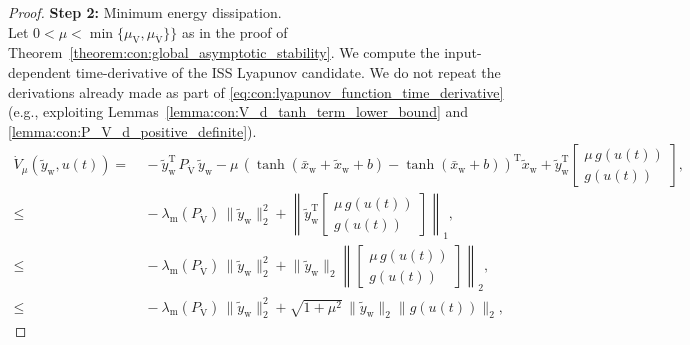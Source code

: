 \begin{proof}
    \textbf{Step 2:} Minimum energy dissipation.\\
    Let $0 < \mu < \min \{ \mu_{\mathrm{V}}, \mu_{\dot{\mathrm{V}}} \}\}$ as in the proof of Theorem~\ref{theorem:con:global_asymptotic_stability}.
    We compute the input-dependent time-derivative of the ISS Lyapunov candidate. We do not repeat the derivations already made as part of \eqref{eq:con:lyapunov_function_time_derivative} (e.g., exploiting Lemmas~\ref{lemma:con:V_d_tanh_term_lower_bound} and \ref{lemma:con:P_V_d_positive_definite}).
    \begin{equation}
    \begin{split}
        \dot{V}_\mu(\tilde{y}_\mathrm{w}, u(t)) =& \: %
        -\tilde{y}_\mathrm{w}^\mathrm{T} \, P_{\dot{\mathrm{V}}} \, \tilde{y}_\mathrm{w} - \mu \, \left ( \tanh(\bar{x}_\mathrm{w} + \tilde{x}_\mathrm{w} + b) - \tanh(\bar{x}_\mathrm{w} + b) \right )^\mathrm{T} \tilde{x}_\mathrm{w} + \tilde{y}_\mathrm{w}^\mathrm{T} \begin{bmatrix}
            \mu \, g(u(t))\\
            g(u(t))
        \end{bmatrix},\\
        \leq& \: -\lambda_\mathrm{m}\left(P_{\dot{\mathrm{V}}} \right) \, \lVert \tilde{y}_\mathrm{w} \rVert_2^2 + \left \lVert \tilde{y}_\mathrm{w}^\mathrm{T}\begin{bmatrix}\mu \, g(u(t))\\ g(u(t)) \end{bmatrix} \right \rVert_1,\\
        \leq& \: -\lambda_\mathrm{m}\left(P_{\dot{\mathrm{V}}} \right) \, \lVert \tilde{y}_\mathrm{w} \rVert_2^2 +  \lVert \tilde{y}_\mathrm{w} \rVert_2 \left \lVert \begin{bmatrix}\mu \, g(u(t))\\ g(u(t)) \end{bmatrix} \right \rVert_2,\\
        \leq& \: -\lambda_\mathrm{m}\left(P_{\dot{\mathrm{V}}} \right) \, \lVert \tilde{y}_\mathrm{w} \rVert_2^2 + \sqrt{1+\mu^2} \, \lVert \tilde{y}_\mathrm{w} \rVert_2 \lVert g(u(t)) \rVert_2,
    \end{split}
    \end{equation}

\end{proof}
